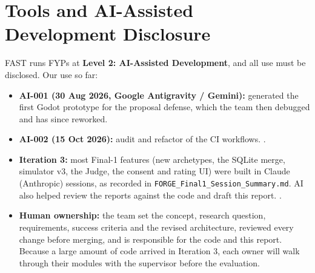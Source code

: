 \section{Tools and AI-Assisted Development Disclosure}\label{sec:ai_disclosure}
FAST runs FYPs at \textbf{Level 2: AI-Assisted Development}, and all use must be disclosed. Our use so far:
\begin{itemize}
    \item \textbf{AI-001 (30 Aug 2026, Google Antigravity / Gemini):} generated the first Godot prototype for the proposal defense, which the team then debugged and has since reworked.
    \item \textbf{AI-002 (15 Oct 2026):} audit and refactor of the CI workflows. .
    \item \textbf{Iteration 3:} most Final-1 features (new archetypes, the SQLite merge, simulator v3, the Judge, the consent and rating UI) were built in Claude (Anthropic) sessions, as recorded in \texttt{FORGE\_Final1\_Session\_Summary.md}. AI also helped review the reports against the code and draft this report. .
    \item \textbf{Human ownership:} the team set the concept, research question, requirements, success criteria and the revised architecture, reviewed every change before merging, and is responsible for the code and this report. Because a large amount of code arrived in Iteration 3, each owner will walk through their modules with the supervisor before the evaluation.
\end{itemize}

